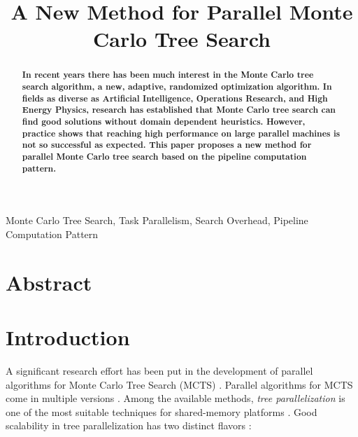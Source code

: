 \documentclass[10pt, conference, compsocconf]{IEEEtran}
\begin{document}
\title{A New Method for Parallel Monte Carlo Tree Search}





\author{
}













\maketitle


\begin{abstract}
\textbf{
In recent years there has been much interest in the
Monte Carlo tree search algorithm, a new, adaptive, randomized optimization algorithm. In fields as diverse as Artificial Intelligence, Operations Research, and High Energy Physics,
research has established that Monte Carlo tree search can find good solutions without domain dependent heuristics. However, practice shows that reaching high performance on large parallel machines is not so successful as expected. This paper proposes a new method for parallel Monte Carlo tree search based on the pipeline computation pattern.
}
\end{abstract}

\begin{IEEEkeywords}
Monte Carlo Tree Search, Task Parallelism, Search Overhead, Pipeline Computation Pattern

\end{IEEEkeywords}


\IEEEpeerreviewmaketitle
\section{Abstract}

\section{Introduction}
A significant research effort has been put in the development of parallel algorithms for Monte Carlo Tree Search (MCTS) \cite{Chaslot2008,Schaefers2014,Mirsoleimani2015a}. Parallel algorithms for MCTS come in multiple versions \cite{Browne2012}. Among the available methods, \textit{tree parallelization} is one of the most suitable techniques for shared-memory platforms \cite{Chaslot2008}. Good scalability in tree parallelization has two distinct flavors \cite{Segal:2010:SPU:1950322.1950326,Mirsoleimani2015}: 
\end{document}
